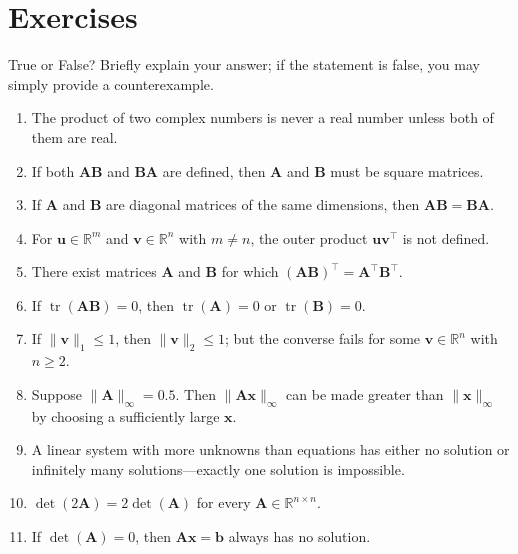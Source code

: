 \section{Exercises}

\begin{exercise} %
    True or False? Briefly explain your answer; if the statement is false, you may simply provide a counterexample.
    \begin{enumerate}[label=(\alphalphenum*)]
        \item The product of two complex numbers is never a real number unless both of them are real.
        \item If both $\mathbf{A}\mathbf{B}$ and $\mathbf{B}\mathbf{A}$ are defined, then $\mathbf{A}$ and $\mathbf{B}$ must be square matrices.
        \item If $\mathbf{A}$ and $\mathbf{B}$ are diagonal matrices of the same dimensions, then $\mathbf{A}\mathbf{B} = \mathbf{B}\mathbf{A}$.
        \item For $\mathbf{u} \in \mathbb{R}^m$ and $\mathbf{v} \in \mathbb{R}^n$ with $m \neq n$, the outer product $\mathbf{u}\mathbf{v}^\top$ is not defined.
        \item There exist matrices $\mathbf{A}$ and $\mathbf{B}$ for which $(\mathbf{A}\mathbf{B})^\top = \mathbf{A}^\top\mathbf{B}^\top$.
        \item If $\operatorname{tr}(\mathbf{A}\mathbf{B}) = 0$, then $\operatorname{tr}(\mathbf{A}) = 0$ or $\operatorname{tr}(\mathbf{B}) = 0$.
        \item If $\|\mathbf{v}\|_1 \leq 1$, then $\|\mathbf{v}\|_2 \leq 1$; but the converse fails for some $\mathbf{v} \in \mathbb{R}^n$ with $n \geq 2$.
        \item Suppose $\|\mathbf{A}\|_\infty = 0.5$. Then $\|\mathbf{A}\mathbf{x}\|_\infty$ can be made greater than $\|\mathbf{x}\|_\infty$ by choosing a sufficiently large $\mathbf{x}$.
        \item A linear system with more unknowns than equations has either no solution or infinitely many solutions---exactly one solution is impossible.
        \item $\det(2\mathbf{A}) = 2\det(\mathbf{A})$ for every $\mathbf{A} \in \mathbb{R}^{n \times n}$.
        \item If $\det(\mathbf{A}) = 0$, then $\mathbf{A}\mathbf{x}=\mathbf{b}$ always has no solution.

\end{enumerate}
\end{exercise}
